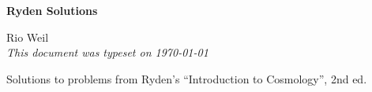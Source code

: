 \documentclass[10pt]{article}
\numberwithin{equation}{section}
\begin{document}
\begin{tcolorbox}
  \begin{center}
  \begin{Large}
    \textbf{Ryden Solutions} \\
    \vspace{5pt}
  \end{Large}
  \begin{large}
        Rio Weil \\
\vspace{5pt}
    \emph{This document was typeset on \today}
  \end{large}
  \end{center}
\end{tcolorbox}

\begin{center}
  Solutions to problems from Ryden's ``Introduction to Cosmology'', 2nd ed.

\end{center}
\tableofcontents

\newpage

\newpage

\newpage 

\newpage 

\newpage

\newpage

\newpage

\newpage

\newpage

\newpage

\newpage

\newpage

\end{document}
